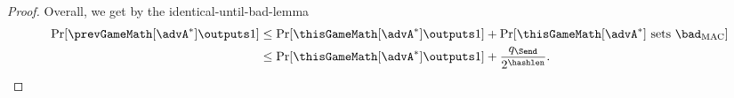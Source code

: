 \begin{proof}
	Overall, we get by the identical-until-bad-lemma
	\begin{align*}
	\Pr[ \prevGameMath[\advA^*] \outputs 1 ] &\leq \Pr[ \thisGameMath[\advA^*] \outputs 1 ] + \Pr[ \thisGameMath[\advA^*] \text{ sets } \bad_\mathrm{MAC}] \\ &\leq \Pr[ \thisGameMath[\advA^*] \outputs 1 ] + \frac{q_\Send}{2^{\hashlen}}.
	\end{align*}


%	
%	

\end{proof}
